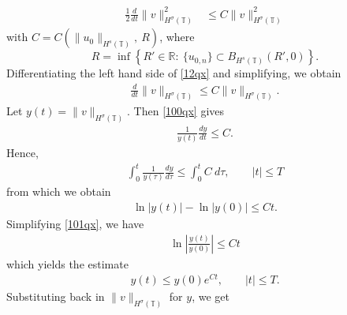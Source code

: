 \documentclass[12pt,reqno]{amsart}
\newcommand{\rr}{\mathbb{R}}
\newcommand{\ci}{\mathbb{T}}
\theoremstyle{plain}  %
\theoremstyle{definition}
\begin{document}
\begin{appendices}
\begin{equation}
	\begin{split}
		\label{12qx}
		\frac{1}{2}\frac{d}{dt} \|v\|_{H^{\sigma}(\ci)}^2
		& \le
	C \|v\|_{H^{\sigma}(\ci)}^2
\end{split}
\end{equation}
with $C = C(\|u_0\|_{H^s(\ci)}, \ R)$, where
\begin{equation}
	\label{r-def}
	R = \inf \left\{ R' \in \rr:\ \{u_{0,n}\} \subset B_{H^s(\ci)}(R',0)
	\right\}.
\end{equation}
Differentiating the left hand side of \eqref{12qx} and simplifying, we
obtain
\begin{equation}
	\begin{split}
		\frac{d}{dt}\|v\|_{H^{\sigma}(\ci)} \le C \|v\|_{H^{\sigma}(\ci)}.
		\label{100qx}
	\end{split}
\end{equation}
Let $y(t) = \|v\|_{H^{\sigma}(\ci)}$. Then \eqref{100qx} gives
\begin{equation*}
	\begin{split}
		\frac{1}{y(t)}\frac{dy}{dt} \le C.
	\end{split}
\end{equation*}
Hence,
\begin{equation*}
	\begin{split}
		\int_0^t \frac{1}{y(\tau)} \frac{dy}{d \tau}
		\le \int_0^t C \ d \tau, \qquad |t| \le T
	\end{split}
\end{equation*}
from which we obtain
\begin{equation}
	\begin{split}
		\ln |y(t) | - \ln |y(0)| \le C t.
		\label{101qx}
	\end{split}
\end{equation}
Simplifying \eqref{101qx}, we have
\begin{equation*}
	\begin{split}
		\ln \left |\frac{y(t)}{y(0)} \right | \le C t
	\end{split}
\end{equation*}
which yields the estimate
\begin{equation*}
	\begin{split}
		y(t) \le y(0) e^{C t}, \qquad |t| \le T.
	\end{split}
\end{equation*}
Substituting back in $\|v\|_{H^{\sigma}(\ci)}$ for $y$, we get
\begin{equation*}
	\begin{split}

\end{split}
\end{equation*}
\end{appendices}
\end{document}

